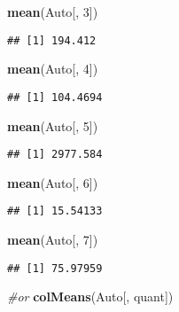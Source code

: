 \documentclass[
]{article}
\newenvironment{Shaded}{\begin{snugshade}}{\end{snugshade}}
\newcommand{\CommentTok}[1]{\textcolor[rgb]{0.56,0.35,0.01}{\textit{#1}}}
\newcommand{\DecValTok}[1]{\textcolor[rgb]{0.00,0.00,0.81}{#1}}
\newcommand{\FunctionTok}[1]{\textcolor[rgb]{0.13,0.29,0.53}{\textbf{#1}}}
\newcommand{\NormalTok}[1]{#1}
\begin{document}
\begin{Shaded}
\begin{Highlighting}[]
\FunctionTok{mean}\NormalTok{(Auto[, }\DecValTok{3}\NormalTok{])}
\end{Highlighting}
\end{Shaded}

\begin{verbatim}
## [1] 194.412
\end{verbatim}

\begin{Shaded}
\begin{Highlighting}[]
\FunctionTok{mean}\NormalTok{(Auto[, }\DecValTok{4}\NormalTok{])}
\end{Highlighting}
\end{Shaded}

\begin{verbatim}
## [1] 104.4694
\end{verbatim}

\begin{Shaded}
\begin{Highlighting}[]
\FunctionTok{mean}\NormalTok{(Auto[, }\DecValTok{5}\NormalTok{])}
\end{Highlighting}
\end{Shaded}

\begin{verbatim}
## [1] 2977.584
\end{verbatim}

\begin{Shaded}
\begin{Highlighting}[]
\FunctionTok{mean}\NormalTok{(Auto[, }\DecValTok{6}\NormalTok{])}
\end{Highlighting}
\end{Shaded}

\begin{verbatim}
## [1] 15.54133
\end{verbatim}

\begin{Shaded}
\begin{Highlighting}[]
\FunctionTok{mean}\NormalTok{(Auto[, }\DecValTok{7}\NormalTok{])}
\end{Highlighting}
\end{Shaded}

\begin{verbatim}
## [1] 75.97959
\end{verbatim}

\begin{Shaded}
\begin{Highlighting}[]
\CommentTok{\#or}
\FunctionTok{colMeans}\NormalTok{(Auto[, quant])}
\end{Highlighting}
\end{Shaded}
\end{document}
